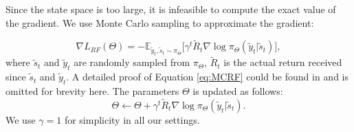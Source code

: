 \documentclass[letterpaper]{article} %
\begin{document}
	Since the state space is too large, it is infeasible to compute the exact value of the gradient. We use Monte Carlo sampling to approximate the gradient:

    \begin{equation} \label{eq:MCRF}
	\nabla L_{RF}(\Theta) = - \mathbb{E}_{\tilde{y}_t, \tilde{s}_t \sim \pi_{\Theta}} \Big[ \gamma^t \tilde{R}_t \nabla \log \pi_{\Theta}(\tilde{y}_t|\tilde{s}_t) \Big] ,
	\end{equation}
	where $\tilde{s}_t$ and $\tilde{y}_t$ are randomly sampled from $\pi_{\Theta}$, $\tilde{R}_t$ is the actual return received since $\tilde{s}_t$ and $\tilde{y}_t$. A detailed proof of Equation \ref{eq:MCRF} could be found in \cite{sutton_reinforcement_nodate} and is omitted for brevity here. The parameters $\Theta$ is updated as follows:
	\begin{equation} \label{eq:update}
	\Theta \leftarrow \Theta + \gamma^t \tilde{R}_t \nabla \log \pi_{\Theta}(\tilde{y}_t|\tilde{s}_t) .
	\end{equation}
	We use $\gamma=1$ for simplicity in all our settings.
	
\end{document}
